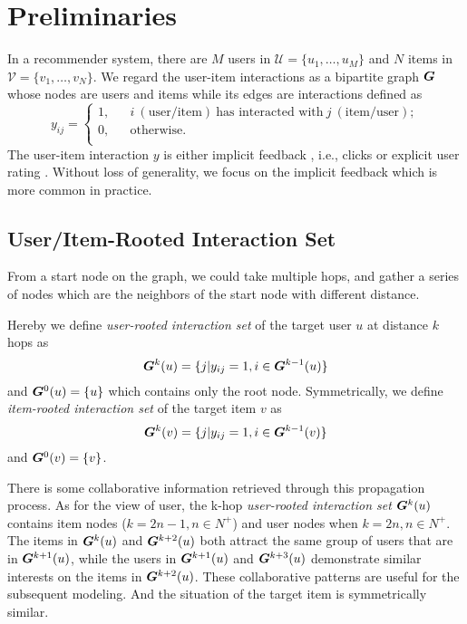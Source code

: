 \section{Preliminaries}\label{sec:preliminaries}
In a recommender system, there are $M$ users in $\mathcal{U}=\{u_1, \ldots, u_M\}$ and $N$ items in $\mathcal{V}=\{v_1, \ldots, v_N\}$.
We regard the user-item interactions as a bipartite graph $\bm{G}$ whose nodes are users and items while its edges are interactions defined as
\begin{equation}
	y_{ij} = \left\{
		\begin{array}{rcl}
			1, & & i~(\text{user}/\text{item})~ \text{has interacted with} ~j~(\text{item}/\text{user}); \\
			0, & & \text{otherwise.} \\
		\end{array}
	\right.
\end{equation}
The user-item interaction $y$ is either implicit feedback \cite{agarwal2009spatio}, i.e., clicks or explicit user rating \cite{koren2009collaborative}.
Without loss of generality, we focus on the implicit feedback which is more common in practice\cite{zhou2018deepa,ren2019lifelong,guo2017deepfm}.

\subsection{User/Item-Rooted Interaction Set}
From a start node on the graph, we could take multiple hops, and gather a series of nodes which are the neighbors of the start node with different distance. 

Hereby we define \textit{user-rooted interaction set} of the target user $u$ at distance $k$ hops as
\begin{equation}
\bm{G}^k(u) = \{j|y_{ij}=1, i \in \bm{G}^{k-1}(u) \}
\end{equation}
and $\bm{G}^{0}(u) = \{u\}$ which contains only the root node. Symmetrically, we define \textit{item-rooted interaction set} of the target item $v$ as 
\begin{equation}
\bm{G}^k(v) = \{j|y_{ij}=1, i \in \bm{G}^{k-1}(v) \}
\end{equation}
and $\bm{G}^{0}(v) = \{v\}$.

There is some collaborative information retrieved through this propagation process. As for the view of user, the k-hop \textit{user-rooted interaction set} $\bm{G}^k(u)$ contains item nodes ($k=2n-1, n \in N^{+}$) and user nodes when $k = 2n, n \in N^{+}$. The items in $\bm{G}^k(u)$ and $\bm{G}^{k+2}(u)$ both attract the same group of users that are in $\bm{G}^{k+1}(u)$, while the users in $\bm{G}^{k+1}(u)$ and $\bm{G}^{k+3}(u)$ demonstrate similar interests on the items in $\bm{G}^{k+2}(u)$. 
These collaborative patterns are useful for the subsequent modeling.
And the situation of the target item is symmetrically similar. 

